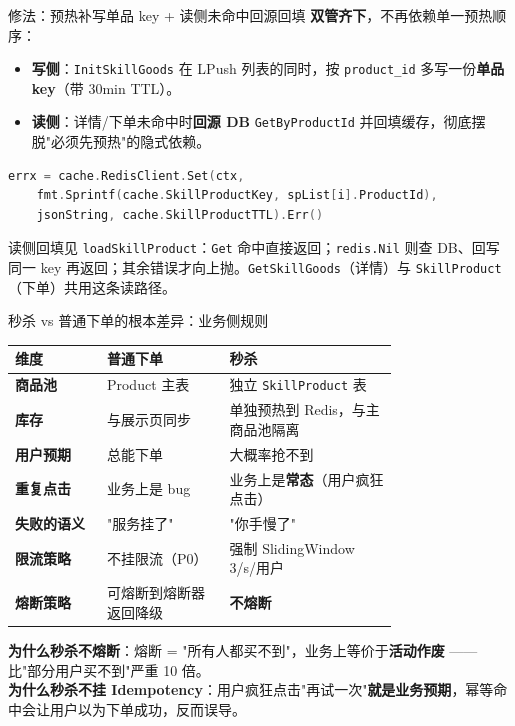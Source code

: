 \documentclass[aspectratio=169,11pt]{beamer}
\begin{document}
\begin{frame}{修法：预热补写单品 key + 读侧未命中回源回填}
\small \textbf{双管齐下}，不再依赖单一预热顺序：
\begin{itemize}\itemsep0pt
  \item \textbf{写侧}：\texttt{InitSkillGoods} 在 LPush 列表的同时，按 \texttt{product\_id} 多写一份\textbf{单品 key}（带 30min TTL）。
  \item \textbf{读侧}：详情/下单未命中时\textbf{回源 DB} \texttt{GetByProductId} 并回填缓存，彻底摆脱"必须先预热"的隐式依赖。
\end{itemize}
\begin{lstlisting}[language=Go,firstnumber=61,
  caption={}]
errx = cache.RedisClient.Set(ctx,
    fmt.Sprintf(cache.SkillProductKey, spList[i].ProductId),
    jsonString, cache.SkillProductTTL).Err()
\end{lstlisting}
\vspace{-1mm}
\scriptsize 读侧回填见 \texttt{loadSkillProduct}：\texttt{Get} 命中直接返回；\texttt{redis.Nil} 则查 DB、回写同一 key 再返回；其余错误才向上抛。\texttt{GetSkillGoods}（详情）与 \texttt{SkillProduct}（下单）共用这条读路径。
\end{frame}

\begin{frame}[shrink]{秒杀 vs 普通下单的根本差异：业务侧规则}
\scriptsize
\begin{tabular}{@{}lp{0.32\linewidth}p{0.44\linewidth}@{}}
\toprule
维度 & 普通下单 & 秒杀 \\
\midrule
\textbf{商品池}      & Product 主表 & 独立 \texttt{SkillProduct} 表 \\
\textbf{库存}        & 与展示页同步 & 单独预热到 Redis，与主商品池隔离 \\
\textbf{用户预期}    & 总能下单 & 大概率抢不到 \\
\textbf{重复点击}    & 业务上是 bug & 业务上是\textbf{常态}（用户疯狂点击） \\
\textbf{失败的语义}  & "服务挂了" & "你手慢了" \\
\textbf{限流策略}    & 不挂限流（P0） & 强制 SlidingWindow 3/s/用户 \\
\textbf{熔断策略}    & 可熔断到熔断器返回降级 & \textbf{不熔断} \\
\bottomrule
\end{tabular}
\vspace{2mm}

\small \textbf{为什么秒杀不熔断}：熔断 = "所有人都买不到"，业务上等价于\textbf{活动作废} —— 比"部分用户买不到"严重 10 倍。\\
\textbf{为什么秒杀不挂 Idempotency}：用户疯狂点击"再试一次"\textbf{就是业务预期}，幂等命中会让用户以为下单成功，反而误导。
\end{frame}
\end{document}
